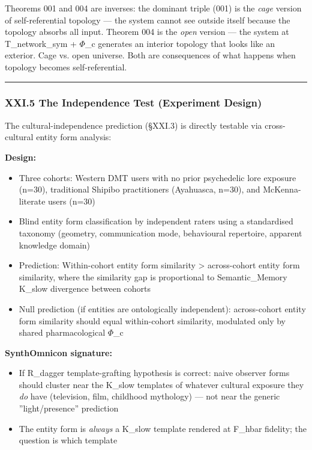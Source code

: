 \documentclass[12pt,a4paper]{article}
\begin{document}
Theorems 001 and 004 are inverses: the dominant triple (001) is the \emph{cage} version of self-referential topology --- the system cannot see outside itself because the topology absorbs all input. Theorem 004 is the \emph{open} version --- the system at T\_network\_sym + $\Phi$\_c generates an interior topology that looks like an exterior. Cage vs. open universe. Both are consequences of what happens when topology becomes self-referential.

\begin{center}
\rule{0.5\textwidth}{0.4pt}
\end{center}

\subsubsection{XXI.5 The Independence Test (Experiment Design)}

The cultural-independence prediction (§XXI.3) is directly testable via cross-cultural entity form analysis:

\textbf{Design:}

\begin{itemize}
    \item Three cohorts: Western DMT users with no prior psychedelic lore exposure (n=30), traditional Shipibo practitioners (Ayahuasca, n=30), and McKenna-literate users (n=30)
    \item Blind entity form classification by independent raters using a standardised taxonomy (geometry, communication mode, behavioural repertoire, apparent knowledge domain)
    \item Prediction: Within-cohort entity form similarity \textgreater{} across-cohort entity form similarity, where the similarity gap is proportional to Semantic\_Memory K\_slow divergence between cohorts
    \item Null prediction (if entities are ontologically independent): across-cohort entity form similarity should equal within-cohort similarity, modulated only by shared pharmacological $\Phi$\_c
\end{itemize}

\textbf{SynthOmnicon signature:}

\begin{itemize}
    \item If R\_dagger template-grafting hypothesis is correct: naive observer forms should cluster near the K\_slow templates of whatever cultural exposure they \emph{do} have (television, film, childhood mythology) --- not near the generic ''light/presence'' prediction
    \item The entity form is \emph{always} a K\_slow template rendered at F\_hbar fidelity; the question is which template
\end{itemize}
\end{document}
